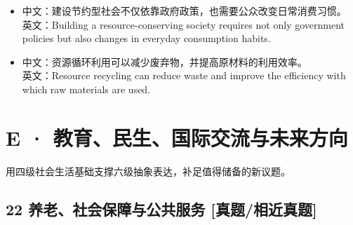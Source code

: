 \documentclass[a4paper,11pt,UTF8,fontset=none]{ctexart}
\begin{document}
\begin{itemize}[leftmargin=1.7em,itemsep=1pt,parsep=0pt,topsep=2pt]
\item \noindent 中文：建设节约型社会不仅依靠政府政策，也需要公众改变日常消费习惯。\\ 英文：Building a resource-conserving society requires not only government policies but also changes in everyday consumption habits.\par


\item \noindent 中文：资源循环利用可以减少废弃物，并提高原材料的利用效率。\\ 英文：Resource recycling can reduce waste and improve the efficiency with which raw materials are used.\par


\end{itemize}

\section{E · 教育、民生、国际交流与未来方向}

\noindent 用四级社会生活基础支撑六级抽象表达，补足值得储备的新议题。\par

\subsection{22 养老、社会保障与公共服务 {\color{AccentBlue} [真题/相近真题]}}
\end{document}
